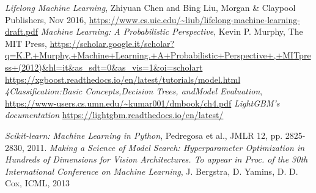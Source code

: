 \documentclass[a4paper, oneside]{book}
\begin{document}
\begin{thebibliography}{32}
			 \textit{Lifelong Machine Learning}, Zhiyuan Chen and Bing Liu, Morgan \& Claypool Publishers, Nov 2016, \url{https://www.cs.uic.edu/~liub/lifelong-machine-learning-draft.pdf}
			 \textit{Machine Learning: A Probabilistic Perspective}, Kevin P. Murphy, The MIT Press, \url{https://scholar.google.it/scholar?q=K.P.+Murphy,+Machine+Learning.+A+Probabilistic+Perspective+,+MITpress+(2012)&hl=it&as_sdt=0&as_vis=1&oi=scholart}
			 \url{https://xgboost.readthedocs.io/en/latest/tutorials/model.html}
			 \textit{4Classification:Basic Concepts,Decision Trees, andModel Evaluation}, \url{https://www-users.cs.umn.edu/~kumar001/dmbook/ch4.pdf}
			 \textit{LightGBM’s documentation} 
			\url{https://lightgbm.readthedocs.io/en/latest/}
			
			
			\textit{Scikit-learn: Machine Learning in Python}, Pedregosa et al., JMLR 12, pp. 2825-2830, 2011.
			\textit{Making a Science of Model Search: Hyperparameter Optimization in Hundreds of Dimensions for Vision Architectures. To appear in Proc. of the 30th International Conference on Machine Learning}, J. Bergstra, D. Yamins, D. D. Cox, ICML, 2013
			
	\end{thebibliography}
\end{document}

